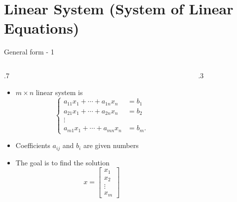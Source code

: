 \documentclass{beamer}
\theoremstyle{definition}
\theoremstyle{theorem}
\begin{document}
\section{Linear System (System of Linear Equations)}
\begin{frame}
 {General form - 1}
\begin{columns}
\begin{column}
 {.7\textwidth}
 \begin{itemize}
 \item $m\times n$ linear system is 
\begin{equation*}
 \label{eq:02}
\left\{
\begin{array}
 {ll}
 a_{11} x_{1} + \cdots + a_{1n} x_{n} &= b_{1} \\
 a_{21} x_{1} + \cdots + a_{2n} x_{n} &= b_{2} \\
 \vdots \\
 a_{m1} x_{1} + \cdots + a_{mn} x_{n} &= b_{m}.
\end{array}
\right.
\end{equation*}
\item Coefficients $a_{ij}$ and $b_{i}$ are given numbers
\item The goal is to find the solution
$$x = 
\begin{bmatrix}
 x_{1}\\ x_{2}\\ \vdots\\ x_{m}
\end{bmatrix}
$$
\end{itemize}

\end{column}
\begin{column}
 {.3\textwidth}
\end{column}
\end{columns}

 
\end{frame}
\end{document}
